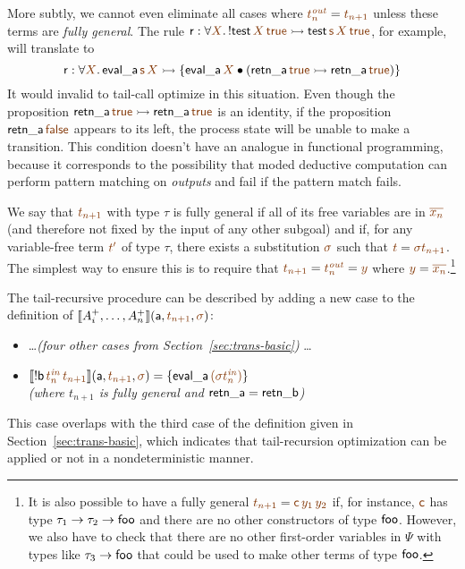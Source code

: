 More subtly, we cannot even eliminate all cases where $\lf{t^{\it out}_n} =
\lf{t_{n+1}}$ unless these terms are {\it fully general}. The rule
${\sf r} : \forall\lf{X}.\,{!}{\sf test}\,\lf{X}\,\lf{\sf true} 
   \lefti {\sf test}\,\lf{{\sf s}\,X}\,\lf{\sf true}$, for example, 
will translate to
\[
{\sf r} : \forall\lf{X}.\,{\sf eval\_a}\,\lf{{\sf s}\,{X}} \lefti 
 \{ {\sf eval\_a}\,\lf{X} \fuse
   ({\sf retn\_a}\,\lf{\sf true} \lefti {\sf retn\_a}\,\lf{\sf true})\}
\]
It would invalid to tail-call optimize in this situation. Even though
the proposition ${\sf retn\_a}\,\lf{\sf true} \lefti {\sf
  retn\_a}\,\lf{\sf true}$ is an identity, if the proposition ${\sf
  retn\_a}\,\lf{\sf false}$ appears to its left, the process state
will be unable to make a transition.  This condition doesn't have an
analogue in functional programming, because it corresponds to the
possibility that moded deductive computation can perform pattern
matching on {\it outputs} and fail if the pattern match fails.

We say that
$\lf{t_{n+1}}$ with type $\tau$ is fully general if all of its free
variables are in $\lf{\overline{x_n}}$ (and therefore not fixed by the
input of any other subgoal) and if, for any variable-free term $\lf{t'}$ of
type $\tau$, there exists a substitution $\lf{\sigma}$ such that $\lf{t} =
\lf{{\sigma}t_{n+1}}$. The simplest way to ensure this is to require
that $\lf{t_{n+1}} = \lf{t^{\it out}_n} = \lf{y}$ where $\lf{y} =
\lf{\overline{x_n}}$.\footnote{It is also possible to have a fully general
  $\lf{t_{n+1}} = \lf{{\sf c}\,y_1\,y_2}$ if, for instance, $\lf{\sf c}$ 
has type
  $\tau_1 \rightarrow \tau_2 \rightarrow {\sf foo}$ and there are no
  other constructors of type ${\sf foo}$. However, we also have to
  check that there are no other first-order variables in $\Psi$ with
  types like $\tau_3 \rightarrow {\sf foo}$ that could be used to make
  other terms of type ${\sf foo}$. %
} 

The tail-recursive procedure can be described by adding a new 
case to the definition of 
$\opbasic{A^+_i,\ldots,A^+_n}{t_{n+1}}{\sigma}$:
\smallskip
\begin{itemize}
\item \ldots {\it (four other cases from Section~\ref{sec:trans-basic})} \ldots
\item $\opbasic{{!}{\sf b}\,\lf{t^{\it in}_n}\,\lf{t_{n+1}}}{\lf{t_{n+1}}}{\sigma} 
  = \{{\sf eval\_a}\,\lf{({\sigma}{t^{\it in}_n})}\}$
\\
  {\it (where $t_{n+1}$ is fully general and ${\sf retn\_a} = {\sf retn\_b}$)}
\end{itemize}
\smallskip
This case overlaps with the third case of the definition given
in Section~\ref{sec:trans-basic}, which indicates that tail-recursion
optimization can be applied or not in a nondeterministic manner.

